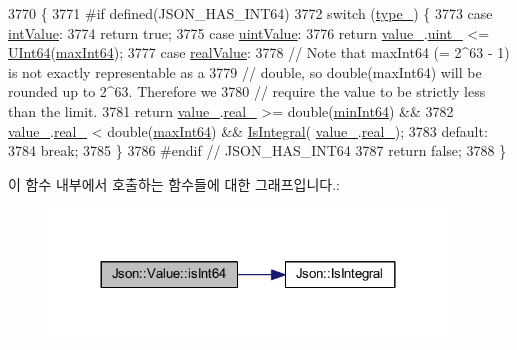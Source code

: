\begin{DoxyCode}
3770                           \{
3771 \textcolor{preprocessor}{#if defined(JSON\_HAS\_INT64)}
3772   \textcolor{keywordflow}{switch} (\hyperlink{class_json_1_1_value_abd222c2536dc88bf330dedcd076d2356}{type\_}) \{
3773   \textcolor{keywordflow}{case} \hyperlink{namespace_json_a7d654b75c16a57007925868e38212b4eae5a9d708d5c9e23ae9bf98898522512d}{intValue}:
3774     \textcolor{keywordflow}{return} \textcolor{keyword}{true};
3775   \textcolor{keywordflow}{case} \hyperlink{namespace_json_a7d654b75c16a57007925868e38212b4eaea788d9a3bb00adc6d68d97d43e1ccd3}{uintValue}:
3776     \textcolor{keywordflow}{return} \hyperlink{class_json_1_1_value_aef578244546212705b9f81eb84d7e151}{value\_}.\hyperlink{union_json_1_1_value_1_1_value_holder_aab65665dc15a24a29a8e93cdeeaa7e50}{uint\_} <= \hyperlink{class_json_1_1_value_a8b62564be8c087c6d18de180ff4e13e3}{UInt64}(\hyperlink{class_json_1_1_value_a4492634870b8c5709ce967b384ac6006}{maxInt64});
3777   \textcolor{keywordflow}{case} \hyperlink{namespace_json_a7d654b75c16a57007925868e38212b4eab837c7b869c14d8be712deb45c9e490e}{realValue}:
3778     \textcolor{comment}{// Note that maxInt64 (= 2^63 - 1) is not exactly representable as a}
3779     \textcolor{comment}{// double, so double(maxInt64) will be rounded up to 2^63. Therefore we}
3780     \textcolor{comment}{// require the value to be strictly less than the limit.}
3781     \textcolor{keywordflow}{return} \hyperlink{class_json_1_1_value_aef578244546212705b9f81eb84d7e151}{value\_}.\hyperlink{union_json_1_1_value_1_1_value_holder_af0c5ca724e5fe3a15db773d750e2351e}{real\_} >= double(\hyperlink{class_json_1_1_value_a815ef899bc312c93bc426511acfe31a7}{minInt64}) &&
3782            \hyperlink{class_json_1_1_value_aef578244546212705b9f81eb84d7e151}{value\_}.\hyperlink{union_json_1_1_value_1_1_value_holder_af0c5ca724e5fe3a15db773d750e2351e}{real\_} < double(\hyperlink{class_json_1_1_value_a4492634870b8c5709ce967b384ac6006}{maxInt64}) && \hyperlink{namespace_json_a1a04cc9d31e64b5912dade003c9b99b5}{IsIntegral}(
      \hyperlink{class_json_1_1_value_aef578244546212705b9f81eb84d7e151}{value\_}.\hyperlink{union_json_1_1_value_1_1_value_holder_af0c5ca724e5fe3a15db773d750e2351e}{real\_});
3783   \textcolor{keywordflow}{default}:
3784     \textcolor{keywordflow}{break};
3785   \}
3786 \textcolor{preprocessor}{#endif // JSON\_HAS\_INT64}
3787   \textcolor{keywordflow}{return} \textcolor{keyword}{false};
3788 \}
\end{DoxyCode}
이 함수 내부에서 호출하는 함수들에 대한 그래프입니다.\+:\nopagebreak
\begin{figure}[H]
\begin{center}
\leavevmode
\includegraphics[width=300pt]{class_json_1_1_value_a4a81fb3c3acdbb68b2e2f30836a4f53e_cgraph}
\end{center}
\end{figure}
